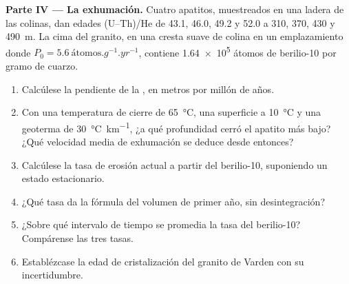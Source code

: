 \begin{problem}
\medskip\noindent\textbf{Parte IV --- La exhumación.} Cuatro apatitos, muestreados
en una ladera de las colinas, dan edades (U--Th)/He de 43.1, 46.0, 49.2 y
\qty{52.0}{\Ma} a 310, 370, 430 y \qty{490}{m}. La cima del granito,
en una cresta suave de colina en un emplazamiento donde $P_0 = \qty{5.6}{\text{átomos}.g^{-1}.yr^{-1}}$,
contiene \num{1.64e5} átomos de berilio-10 por gramo de cuarzo.
\begin{enumerate}[resume]
\item Calcúlese la pendiente de la , en metros por
millón de años.
\item Con una temperatura de cierre de \qty{65}{\celsius}, una superficie a
\qty{10}{\celsius} y una geoterma de \qty{30}{\celsius.km^{-1}}, ¿a qué profundidad
cerró el apatito más bajo? ¿Qué velocidad media de exhumación se deduce desde entonces?
\item Calcúlese la tasa de erosión actual a partir del berilio-10, suponiendo un
estado estacionario.
\item ¿Qué tasa da la fórmula del volumen de primer año, sin desintegración?
\item ¿Sobre qué intervalo de tiempo se promedia la tasa del berilio-10? Compárense las tres
tasas.
\item Establézcase la edad de cristalización del granito de Varden con su
incertidumbre.
\end{enumerate}
\end{problem}
